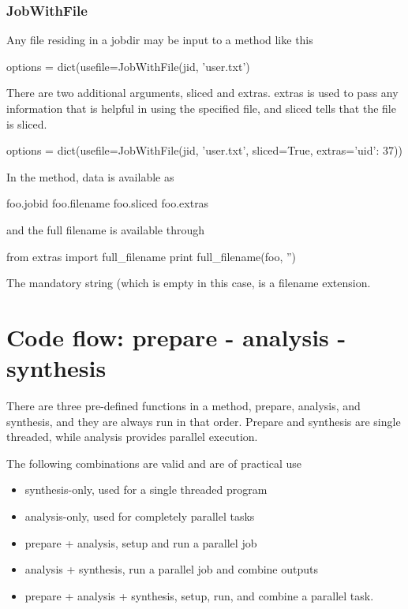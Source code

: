 \subsubsection*{JobWithFile}
Any file residing in a jobdir may be input to a method like this

\begin{python}
options = dict(usefile=JobWithFile(jid, 'user.txt')
\end{python}

There are two additional arguments, sliced and extras.  extras is used
to pass any information that is helpful in using the specified file,
and sliced tells that the file is sliced.

\begin{python}
options = dict(usefile=JobWithFile(jid, 'user.txt', sliced=True, extras={'uid': 37}))
\end{python}
In the method, data is available as

\begin{python}
  foo.jobid
  foo.filename
  foo.sliced
  foo.extras
\end{python}
and the full filename is available through

\begin{python}
from extras import full_filename
print full_filename(foo, '')
\end{python}
The mandatory string (which is empty in this case, is a filename
extension.







\newpage
\section{Code flow:  prepare - analysis - synthesis}

There are three pre-defined functions in a method, prepare, analysis,
and synthesis, and they are always run in that order.  Prepare and
synthesis are single threaded, while analysis provides parallel
execution.

The following combinations are valid and are of practical use
\begin{itemize}
\item synthesis-only, used for a single threaded program
\item analysis-only, used for completely parallel tasks
\item prepare + analysis, setup and run a parallel job
\item analysis + synthesis, run a parallel job and combine outputs
\item prepare + analysis + synthesis, setup, run, and combine a
  parallel task.
\end{itemize}

